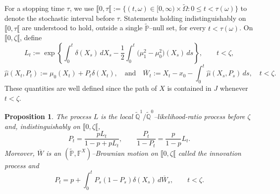 \documentclass[11pt, reqno]{amsart}
\theoremstyle{plain}
\newtheorem{proposition}[theorem]{Proposition}
\theoremstyle{remark}
\numberwithin{equation}{section}
\begin{document}
For a stopping time $\tau$, we use $\llbracket 0,\tau\llbracket
  :=
  \{(t,\omega)\in[0,\infty)\times\widetilde\Omega:
    0\leq t<\tau(\omega)\}$
to denote the stochastic interval before $\tau$. Statements holding
indistinguishably on $\llbracket0,\tau\llbracket$ are understood to
hold, outside a single $\widetilde{\mathbb P}$--null set, for every
$t<\tau(\omega)$.
On $\llbracket0,\zeta\llbracket$, define
\begin{equation}\label{eq:likelihood-process}
  L_t
  :=
  \exp\left\{
    \int_0^t\delta(X_s)\,dX_s
    -
    \frac12\int_0^t
      \bigl(\mu_1^2-\mu_0^2\bigr)(X_s)\,ds
  \right\},
  \qquad t<\zeta,
\end{equation}
\begin{equation}\label{eq:mixed-dynamics-general}
  \widehat\mu(X_t, P_t)
  :=
  \mu_0(X_t)+P_t\delta(X_t),
  \quad \text{and} \quad
  \overline W_t
  :=
  X_t-x_0-\int_0^t\widehat\mu(X_s, P_s)\,ds,
  \quad t<\zeta.
\end{equation}
These quantities are well defined since the path of $X$ is contained in $J$ whenever $t<\zeta$.

\begin{proposition}
\label{prop:likelihood-posterior}
The process $L$ is the local $\widetilde{\mathbb{Q}}^1/\widetilde{\mathbb{Q}}^0$--likelihood-ratio process
before $\zeta$ and, indistinguishably on
$\llbracket0,\zeta\llbracket$,
\begin{equation}\label{eq:posterior-odds}
  P_t
  =
  \frac{pL_t}{1-p+pL_t},
  \qquad
  \frac{P_t}{1-P_t}
  =
  \frac{p}{1-p}L_t.
\end{equation}
%
%
Moreover, $\overline W$ is an
$(\widetilde{\mathbb P},\mathbb F^X)$--Brownian motion on
$\llbracket0,\zeta\llbracket$ called the \emph{innovation process} and
\begin{equation}\label{eq:filtering-equation}
  P_t
  =
  p+\int_0^t
    P_s(1-P_s)\delta(X_s)\,d\overline W_s,
  \qquad t<\zeta.
\end{equation}
\end{proposition}
\end{document}
